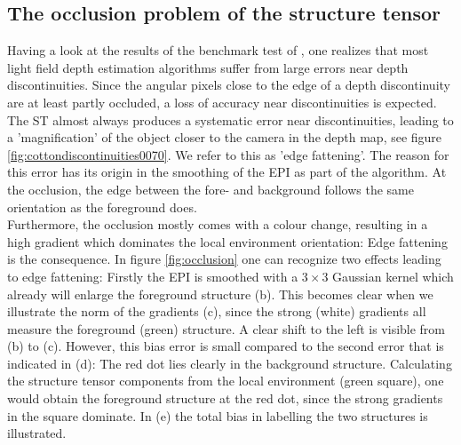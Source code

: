\documentclass  [
  paper    = a4,
  BCOR     = 10mm,
  twoside,
  fontsize = 12pt,
  fleqn,
  toc      = bibnumbered,
  toc      = listofnumbered,
  numbers  = noendperiod,
  headings = normal,
  listof   = leveldown,
  version  = 3.03
]                                       {scrreprt}
\begin{document}
 \subsection{The occlusion problem of the structure tensor}
 \label{sec:occlusionproblem}
 Having a look at the results of the benchmark test of \cite{honauer2016benchmark}, one realizes that most light field depth estimation algorithms suffer from large errors near depth discontinuities. Since the angular pixels close to the edge of a depth discontinuity are at least partly occluded, a loss of accuracy near discontinuities is expected. The ST almost always produces a systematic error near discontinuities, leading to a 'magnification' of the object closer to the camera in the depth map, see figure \ref{fig:cottondiscontinuities0070}. We refer to this as 'edge fattening'. The reason for this error has its origin in the smoothing of the EPI as part of the algorithm.  At the occlusion, the edge between the fore- and background follows the same orientation as the foreground does. \\
  Furthermore, the occlusion mostly comes with a colour change, resulting in a high gradient which dominates the local environment orientation: Edge fattening is the consequence. In figure \ref{fig:occlusion} one can recognize two effects leading to edge fattening: Firstly the EPI is smoothed with a $3\times 3$ Gaussian kernel which already will enlarge the foreground structure (b). This becomes clear when we illustrate the norm of the gradients (c), since the strong (white) gradients all measure the foreground (green) structure. A clear shift to the left is visible from (b) to (c). However, this bias error is small compared to the second error that is indicated in (d): The red dot lies clearly in the background structure. Calculating the structure tensor components from the local environment (green square), one would obtain the foreground structure at the red dot, since the strong gradients in the square dominate. In (e) the total bias in labelling the two structures is illustrated. 
\end{document}

